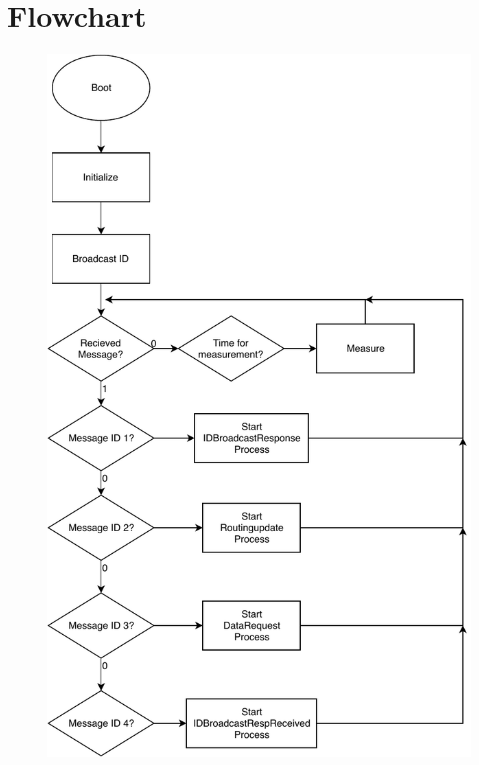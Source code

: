 \documentclass{article}
\begin{document}
\section*{Flowchart}
\begin{figure}[h]
	\includegraphics[width=.5\textwidth, keepaspectratio]{media/Pflow.pdf}
    \caption{}
\end{figure}
\end{document}
